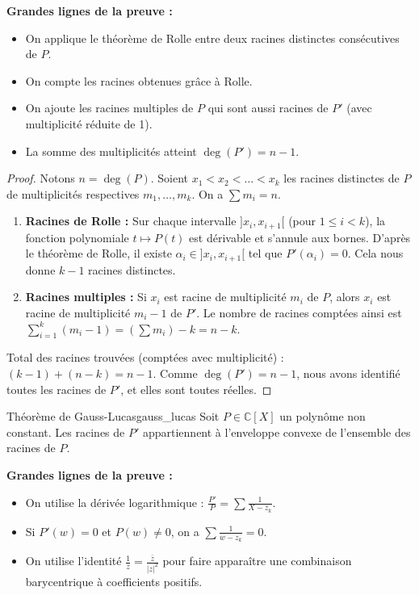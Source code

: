\documentclass{prepacours}
\begin{document}
\noindent \textbf{Grandes lignes de la preuve :}
\begin{itemize}
    \item On applique le théorème de Rolle entre deux racines distinctes consécutives de $P$.
    \item On compte les racines obtenues grâce à Rolle.
    \item On ajoute les racines multiples de $P$ qui sont aussi racines de $P'$ (avec multiplicité réduite de 1).
    \item La somme des multiplicités atteint $\deg(P') = n-1$.
\end{itemize}

\begin{proof}
    Notons $n = \deg(P)$. Soient $x_1 < x_2 < \dots < x_k$ les racines distinctes de $P$ de multiplicités respectives $m_1, \dots, m_k$. On a $\sum m_i = n$.
    \begin{enumerate}
        \item \textbf{Racines de Rolle :} Sur chaque intervalle $]x_i, x_{i+1}[$ (pour $1 \le i < k$), la fonction polynomiale $t \mapsto P(t)$ est dérivable et s'annule aux bornes. D'après le théorème de Rolle, il existe $\alpha_i \in ]x_i, x_{i+1}[$ tel que $P'(\alpha_i) = 0$.
        Cela nous donne $k-1$ racines distinctes.
        \item \textbf{Racines multiples :} Si $x_i$ est racine de multiplicité $m_i$ de $P$, alors $x_i$ est racine de multiplicité $m_i - 1$ de $P'$.
        Le nombre de racines comptées ainsi est $\sum_{i=1}^k (m_i - 1) = (\sum m_i) - k = n - k$.
    \end{enumerate}
    Total des racines trouvées (comptées avec multiplicité) : $(k-1) + (n-k) = n - 1$.
    Comme $\deg(P') = n-1$, nous avons identifié toutes les racines de $P'$, et elles sont toutes réelles.
\end{proof}

\begin{proposition}{Théorème de Gauss-Lucas}{gauss_lucas}
    Soit $P \in \mathbb{C}[X]$ un polynôme non constant.
    Les racines de $P'$ appartiennent à l'enveloppe convexe de l'ensemble des racines de $P$.
\end{proposition}

\noindent \textbf{Grandes lignes de la preuve :}
\begin{itemize}
    \item On utilise la dérivée logarithmique : $\frac{P'}{P} = \sum \frac{1}{X - z_k}$.
    \item Si $P'(w)=0$ et $P(w)\neq 0$, on a $\sum \frac{1}{w-z_k} = 0$.
    \item On utilise l'identité $\frac{1}{z} = \frac{\bar{z}}{|z|^2}$ pour faire apparaître une combinaison barycentrique à coefficients positifs.
\end{itemize}
\end{document}
